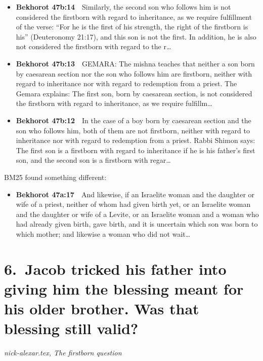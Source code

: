\documentclass[11pt,a4paper]{article}
\begin{document}
\begin{itemize}[leftmargin=1.2em,itemsep=3pt]
\item {\color{ref}\textbf{Bekhorot 47b:14}}\ \ Similarly, the second son who follows him is not considered the firstborn with regard to inheritance, as we require fulfillment of the verse: “For he is the first of his strength, the right of the firstborn is his” (Deuteronomy 21:17), and this son is not the first. In addition, he is also not considered the firstborn with regard to the r\ldots
\item {\color{ref}\textbf{Bekhorot 47b:13}}\ \ GEMARA: The mishna teaches that neither a son born by caesarean section nor the son who follows him are firstborn, neither with regard to inheritance nor with regard to redemption from a priest. The Gemara explains: The first son, born by caesarean section, is not considered the firstborn with regard to inheritance, as we require fulfillm\ldots
\item {\color{ref}\textbf{Bekhorot 47b:12}}\ \ In the case of a boy born by caesarean section and the son who follows him, both of them are not firstborn, neither with regard to inheritance nor with regard to redemption from a priest. Rabbi Shimon says: The first son is a firstborn with regard to inheritance if he is his father’s first son, and the second son is a firstborn with regar\ldots
\end{itemize}
{\color{quiet}\small BM25 found something different:}
\begin{itemize}[leftmargin=1.2em]
\item {\color{ref}\textbf{Bekhorot 47a:17}}\ \ And likewise, if an Israelite woman and the daughter or wife of a priest, neither of whom had given birth yet, or an Israelite woman and the daughter or wife of a Levite, or an Israelite woman and a woman who had already given birth, gave birth, and it is uncertain which son was born to which mother; and likewise a woman who did not wait\ldots
\end{itemize}

\section*{6.\ Jacob tricked his father into giving him the blessing meant for his older brother. Was that blessing still valid?}
{\color{quiet}\small\textit{nick-alexar.tex, The firstborn question}}
\end{document}
